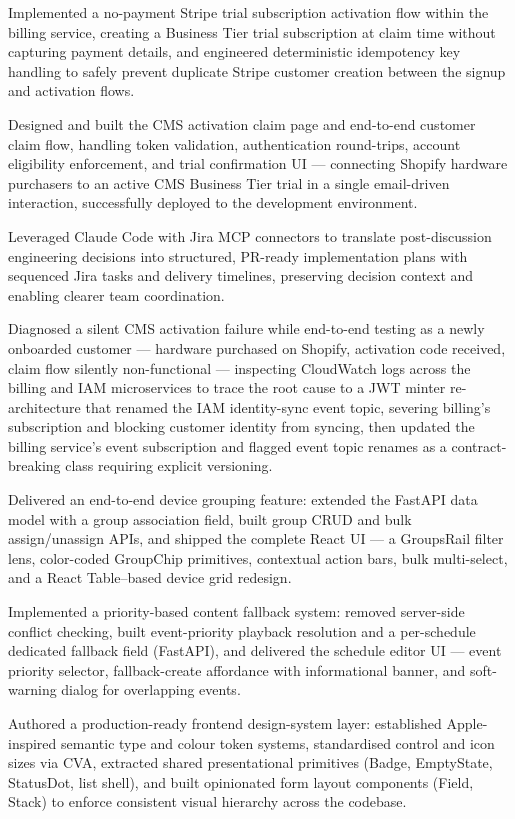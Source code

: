 \documentclass[letterpaper,11pt]{article}
\newcommand{\resumeItem}[1]{
  \item\small #1
}
\begin{document}
                \resumeItem{Implemented a no-payment Stripe trial subscription activation flow within the billing service, creating a Business Tier trial subscription at claim time without capturing payment details, and engineered deterministic idempotency key handling to safely prevent duplicate Stripe customer creation between the signup and activation flows.}
                \resumeItem{Designed and built the CMS activation claim page and end-to-end customer claim flow, handling token validation, authentication round-trips, account eligibility enforcement, and trial confirmation UI — connecting Shopify hardware purchasers to an active CMS Business Tier trial in a single email-driven interaction, successfully deployed to the development environment.}
                \resumeItem{Leveraged Claude Code with Jira MCP connectors to translate post-discussion engineering decisions into structured, PR-ready implementation plans with sequenced Jira tasks and delivery timelines, preserving decision context and enabling clearer team coordination.}
                \resumeItem{Diagnosed a silent CMS activation failure while end-to-end testing as a newly onboarded customer --- hardware purchased on Shopify, activation code received, claim flow silently non-functional --- inspecting CloudWatch logs across the billing and IAM microservices to trace the root cause to a JWT minter re-architecture that renamed the IAM identity-sync event topic, severing billing's subscription and blocking customer identity from syncing, then updated the billing service's event subscription and flagged event topic renames as a contract-breaking class requiring explicit versioning.}
                \resumeItem{Delivered an end-to-end device grouping feature: extended the FastAPI data model with a group association field, built group CRUD and bulk assign/unassign APIs, and shipped the complete React UI --- a GroupsRail filter lens, color-coded GroupChip primitives, contextual action bars, bulk multi-select, and a React Table--based device grid redesign.}
                \resumeItem{Implemented a priority-based content fallback system: removed server-side conflict checking, built event-priority playback resolution and a per-schedule dedicated fallback field (FastAPI), and delivered the schedule editor UI --- event priority selector, fallback-create affordance with informational banner, and soft-warning dialog for overlapping events.}
                \resumeItem{Authored a production-ready frontend design-system layer: established Apple-inspired semantic type and colour token systems, standardised control and icon sizes via CVA, extracted shared presentational primitives (Badge, EmptyState, StatusDot, list shell), and built opinionated form layout components (Field, Stack) to enforce consistent visual hierarchy across the codebase.}
\end{document}
